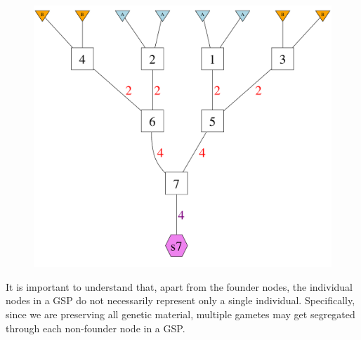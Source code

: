 \begin{figure}
\begin{center}
\includegraphics[width=\columnwidth]{figures/F2.pdf}
\end{center}
\caption[\gspcapone]{\gspcapone}
\label{fig:gsp1}
\end{figure}
It is important to understand that, apart from the founder nodes, the individual
nodes in a GSP do not necessarily represent only a single individual.  Specifically,
since we are preserving all genetic material, multiple gametes may get segregated
through each non-founder node in a GSP\@.

